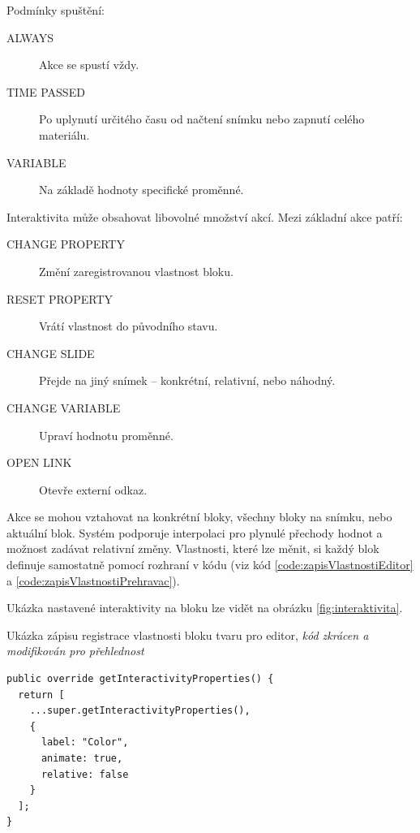 Podmínky spuštění:
\begin{description}
  \item[ALWAYS] Akce se spustí vždy.
  \item[TIME PASSED] Po uplynutí určitého času od načtení snímku nebo zapnutí celého materiálu.
  \item[VARIABLE] Na základě hodnoty specifické proměnné.
\end{description}

Interaktivita může obsahovat libovolné množství akcí. Mezi základní akce patří:

\begin{description}
  \item[CHANGE PROPERTY] Změní zaregistrovanou vlastnost bloku.
  \item[RESET PROPERTY] Vrátí vlastnost do původního stavu.
  \item[CHANGE SLIDE] Přejde na jiný snímek – konkrétní, relativní, nebo náhodný.
  \item[CHANGE VARIABLE] Upraví hodnotu proměnné.
  \item[OPEN LINK] Otevře externí odkaz.
\end{description}

Akce se mohou vztahovat na konkrétní bloky, všechny bloky na snímku, nebo aktuální blok. 
Systém podporuje interpolaci pro plynulé přechody hodnot a možnost zadávat relativní změny.
Vlastnosti, které lze měnit, si každý blok definuje samostatně pomocí rozhraní v kódu (viz kód \ref{code:zapisVlastnostiEditor} a \ref{code:zapisVlastnostiPrehravac}).

Ukázka nastavené interaktivity na bloku lze vidět na obrázku \ref{fig:interaktivita}.

\begin{listing}[ht!]
\caption[Ukázka zápisu registrace vlastnosti bloku tvaru pro editor]{Ukázka zápisu registrace vlastnosti bloku tvaru pro editor, \textit{kód zkrácen a modifikován pro přehlednost}}\label{code:zapisVlastnostiEditor}
\begin{verbatim}
public override getInteractivityProperties() {
  return [
    ...super.getInteractivityProperties(),
    {
      label: "Color",
      animate: true,
      relative: false
    }
  ];
}
\end{verbatim}
\end{listing}



